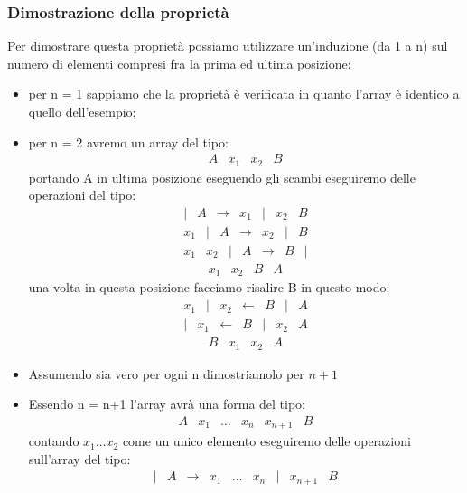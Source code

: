 \documentclass{article}
\begin{document}
\subsubsection{Dimostrazione della proprietà}
Per dimostrare questa proprietà possiamo utilizzare un'induzione (da 1 a n) sul numero di elementi compresi fra la prima ed ultima posizione:
\begin{itemize}
	\item per n = 1 sappiamo che la proprietà è verificata in quanto l'array è identico a quello dell'esempio;
	\item per n = 2 avremo un array del tipo:
	\[
	\begin{array}{cccc}
		A & x_1 & x_2 & B
	\end{array}
	\] 
	portando A in ultima posizione eseguendo gli scambi eseguiremo delle operazioni del tipo:
	\[
	\begin{array}{ccccccc}
		| & A &\rightarrow& x_1 & | & x_2 & B
	\end{array}
	\]
	\[
	\begin{array}{ccccccc}
		x_1 & | & A & \rightarrow & x_2 & | & B
	\end{array}
	\]
	\[
	\begin{array}{ccccccc}
		x_1 & x_2 & | & A & \rightarrow & B & |
	\end{array}
	\]
	\[
	\begin{array}{cccc}
		x_1 & x_2 & B & A 
	\end{array}
	\]
	una volta in questa posizione facciamo risalire B in questo modo:
	\[
	\begin{array}{ccccccc}
		x_1 & | & x_2 & \leftarrow & B & | & A
	\end{array}
	\]
	\[
	\begin{array}{ccccccc}
		| & x_1 & \leftarrow & B & | & x_2 & A
	\end{array}
	\]
	\[
	\begin{array}{cccc}
		B & x_1 & x_2 & A
	\end{array}
	\]
	\item Assumendo sia vero per ogni n dimostriamolo per $n+1$
	\item Essendo n = n+1 l'array avrà una forma del tipo:
	\[
	\begin{array}{ccccccc}
		A & x_1 & \dots & x_n & x_{n+1} & B
	\end{array}
	\]
	contando $x_1 \dots x_2$ come un unico elemento eseguiremo delle operazioni sull'array del tipo:
	\[
	\begin{array}{cccccccccc}
		| & A & \rightarrow & x_1 & \dots & x_n & | & x_{n+1} & B

\end{array}\]
\end{itemize}
\end{document}
